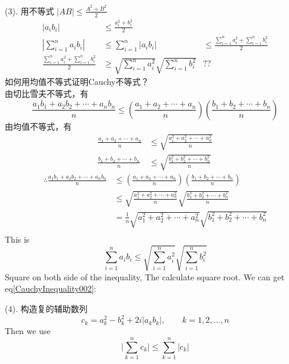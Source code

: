 (3). 用不等式 $ |AB| \leqslant \frac{A^2+B^2}{2} $
\begin{align*}
	|a_ib_i| &\leqslant \frac{a_i^2+b_i^2}{2}&\\
	|\sum_{i=1}^na_ib_i| &\leqslant \sum_{i=1}^n|a_ib_i|&\leqslant \frac{\sum_{i=1}^n a_i^2+\sum_{i=1}^n b_i^2}{2}\\
	\frac{\sum_{i=1}^na_i^2+\sum_{i=1}^nb_i^2}{2} &\ge \sqrt{\sum_{i=1}^n a_i^2} \sqrt{\sum_{i=1}^n b_i^2} &\text{??}
\end{align*}
如何用均值不等式证明Cauchy不等式？\\
由切比雪夫不等式，有
\begin{equation}\label{CauchyInequality002}
	\frac{a_1b_1+a_2b_2+\cdots+a_nb_n}{n} \leqslant (\frac{a_1+a_2+\cdots+a_n}{n}) (\frac{b_1+b_2+\cdots+b_n}{n})
\end{equation}
由均值不等式，有
\begin{align*}
	\frac{a_1+a_2+\cdots+a_n}{n} &\leqslant \sqrt{\frac{a_1^2+a_2^2+\cdots+a_n^2}{n}}\\
	\frac{b_1+b_2+\cdots+b_n}{n} &\leqslant \sqrt{\frac{b_1^2+b_2^2+\cdots+b_n^2}{n}}
\end{align*}
\begin{align*}
	\therefore \frac{a_1b_1+a_2b_2+\cdots+a_nb_n}{n} 
	&\leqslant (\frac{a_1+a_2+\cdots+a_n}{n}) (\frac{b_1+b_2+\cdots+b_n}{n}) \\
	&\leqslant \sqrt{\frac{a_1^2+a_2^2+\cdots+a_n^2}{n}} \sqrt{\frac{b_1^2+b_2^2+\cdots+b_n^2}{n}}\\
	& = \frac{1}{n}\sqrt{a_1^2+a_2^2+\cdots+a_n^2} \sqrt{b_1^2+b_2^2+\cdots+b_n^2}\\
\end{align*}
This is 
\begin{equation*}
	\sum_{i=1}^n a_i b_i \leqslant \sqrt{\sum_{i=1}^n a_i^2} \sqrt{\sum_{i=1}^n b_i^2}
\end{equation*}
Square on both side of the inequality, The calculate square root. We can get eq\ref{CauchyInequality002}:

(4). 构造复的辅助数列
\begin{equation*}
	c_k = a_k^2 - b_k^2 + 2i |a_k b_k|, \qquad k = 1,2,\dots, n
\end{equation*}
Then we use
\begin{equation*}
	\Big|\sum_{k=1}^n c_k\Big| \leqslant \sum_{k=1}^n |c_k|
\end{equation*}

